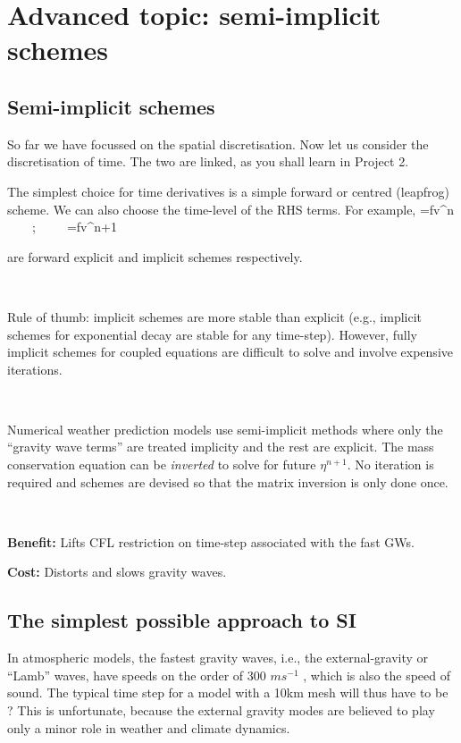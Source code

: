 \section{Advanced topic: semi-implicit schemes}
\subsection{Semi-implicit schemes}

So far we have focussed on the spatial discretisation. Now let us
consider the discretisation of time. The two are linked, as you shall learn in Project 2.

The simplest choice for time derivatives is a simple forward or
centred (leapfrog) scheme. We can also choose the time-level of the RHS terms. For example,
\BEQ
{}=fv^n ~~~~;~~~~~=fv^{n+1}
\EEQ

are forward explicit and implicit schemes respectively.

~

Rule of thumb: implicit schemes are more stable than explicit
(e.g., implicit schemes for exponential decay are stable for any
time-step). However, fully implicit schemes for coupled equations are
difficult to solve and involve expensive iterations. 

~

Numerical weather prediction models use semi-implicit methods where
only the ``gravity wave terms'' are treated implicity and the rest are
explicit. The mass conservation equation can be {\em inverted} to
solve for future $\eta^{n+1}$. No iteration is required and schemes
are devised so that the matrix inversion is only done once. 

~

{\bf Benefit:} Lifts CFL restriction on time-step associated with
the fast GWs.

{\bf Cost:} Distorts and slows gravity waves.


\subsection{The simplest possible approach to SI}

In atmospheric models, the fastest gravity waves, i.e., the external-gravity or “Lamb” waves, have speeds on the order of 300 $m s^{-1}$ , which is also the speed of sound. The typical time step for a model with a 10km mesh will thus have to be \underline{\hspace{1cm}}? This is unfortunate, because the external gravity modes are believed to play only a minor role in weather and climate dynamics. 

